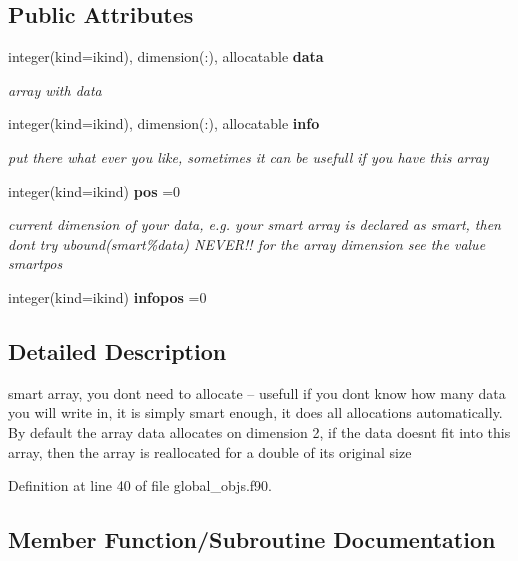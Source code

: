 \subsection*{Public Attributes}
\begin{DoxyCompactItemize}
\item 
integer(kind=ikind), dimension(\+:), allocatable {\bf data}
\begin{DoxyCompactList}\small\item\em array with data \end{DoxyCompactList}\item 
integer(kind=ikind), dimension(\+:), allocatable {\bf info}
\begin{DoxyCompactList}\small\item\em put there what ever you like, sometimes it can be usefull if you have this array \end{DoxyCompactList}\item 
integer(kind=ikind) {\bf pos} =0
\begin{DoxyCompactList}\small\item\em current dimension of your data, e.\+g. your smart array is declared as smart, then don\textquotesingle{}t try ubound(smart\%data) N\+E\+V\+E\+R!! for the array dimension see the value smartpos \end{DoxyCompactList}\item 
integer(kind=ikind) {\bf infopos} =0
\end{DoxyCompactItemize}


\subsection{Detailed Description}
smart array, you don\textquotesingle{}t need to allocate -- usefull if you don\textquotesingle{}t know how many data you will write in, it is simply smart enough, it does all allocations automatically. By default the array data allocates on dimension 2, if the data doesn\textquotesingle{}t fit into this array, then the array is reallocated for a double of its original size 

Definition at line 40 of file global\+\_\+objs.\+f90.



\subsection{Member Function/\+Subroutine Documentation}
